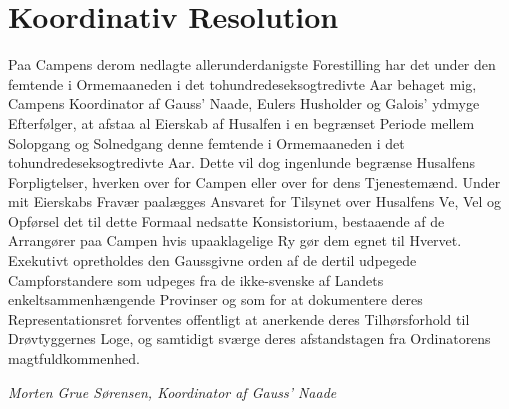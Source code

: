 

\begin{minipage}[b]{0.95\linewidth}
\begin{minipage}[t]{0.47\textwidth}
\vspace{3mm}
\section*{Koordinativ Resolution}

Paa Campens derom nedlagte allerunderdanigste Forestilling har det under den femtende i Ormemaaneden i det tohundredeseksogtredivte Aar behaget mig, Campens Koordinator af Gauss' Naade, Eulers Husholder og Galois' ydmyge Efterfølger, at afstaa al Eierskab af Husalfen i en begrænset Periode mellem Solopgang og Solnedgang denne femtende i Ormemaaneden i det tohundredeseksogtredivte Aar. Dette vil dog ingenlunde begrænse Husalfens Forpligtelser, hverken over for Campen eller over for dens Tjenestemænd. Under mit Eierskabs Fravær paalægges Ansvaret for Tilsynet over Husalfens Ve, Vel og Opførsel det til dette Formaal nedsatte Konsistorium, bestaaende af de Arrangører paa Campen hvis upaaklagelige Ry gør dem egnet til Hvervet. Exekutivt opretholdes den Gaussgivne orden af de dertil udpegede Campforstandere som udpeges fra de ikke-svenske af Landets enkeltsammenhængende Provinser og som for at dokumentere deres Representationsret forventes offentligt at anerkende deres Tilhørsforhold til Drøvtyggernes Loge, og samtidigt sværge deres afstandstagen fra Ordinatorens magtfuldkommenhed.

{\flushright\emph{Morten Grue Sørensen, Koordinator af Gauss' Naade }}


\end{minipage}
\end{minipage}
